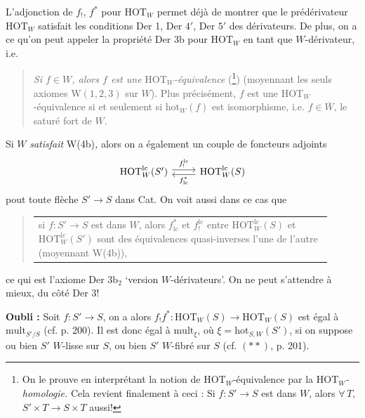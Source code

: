 L'adjonction de $f_!$, $f^*$ pour $\mathrm{HOT}_W$ permet déjà de montrer que le prédérivateur $\mathrm{HOT}_W$
satisfait les conditions Der 1, Der $4'$, Der $5'$ des dérivateurs. De plus, on a ce qu'on peut appeler la propriété Der 3b pour $\mathrm{HOT}_W$ en tant que $W$-dérivateur, i.e.

\begin{quote}
\textit{Si $f\in W$, alors $f$ est une} $\mathrm{HOT}_W$\textit{-équivalence} (\footnote{On le prouve en interprétant la notion de $\mathrm{HOT}_W$-équivalence par la $\mathrm{HOT}_W$\textit{-homologie.} Cela revient finalement à ceci : Si $f : S' \longrightarrow S$ est dans $W$, alors $\forall\, T$, $S'\times T \longrightarrow S\times T$ aussi!}) (moyennant les seuls axiomes W$(1,2,3)$ sur $W$). Plus précisément, $f$ est une $\mathrm{HOT}_W$-équivalence si et seulement si $\mathrm{hot}_W(f)$ est isomorphisme, i.e. $f\in \overline{W}$, le saturé fort de $W$.
\end{quote}

Si $W$ \textit{satisfait} W(4b)\textit{,} alors on a également un couple de foncteurs adjoints
\[
\begin{tikzcd}
\mathrm{HOT}_W^{\mathrm{lc}}(S') \arrow[r, shift left, "f_!^{\mathrm{lc}}"] & \mathrm{HOT}_W^{\mathrm{lc}}(S) \arrow[l, shift left, "f^*_{\mathrm{lc}}"]
\end{tikzcd}
\]
pout toute flèche $S'\longrightarrow S$ dans Cat. On voit aussi dans ce cas que %

\begin{quote}
\begin{tabular}{|p{0.9\linewidth}}
si $f : S' \longrightarrow S$ est dans $W$, alors $f^*_{\mathrm{lc}}$ et $f_!^{\mathrm{lc}}$ entre $\mathrm{HOT}_W^{\mathrm{lc}}(S)$ et $\mathrm{HOT}_W^{\mathrm{lc}}(S')$ sont des équivalences quasi-inverses l'une de l'autre (moyennant W(4b)),
\end{tabular}
\end{quote}

ce qui est l'axiome Der 3b$_2$ ‘version $W$-dérivateurs’. On ne peut s'attendre à mieux, du côté Der 3!

\textbf{Oubli :} Soit $f : S' \longrightarrow S$, on a alors $\boxed{f_!f^*} : \mathrm{HOT}_W(S) \longrightarrow \mathrm{HOT}_W(S)$ est égal à $\mathrm{mult}_{S'/S}$ (cf. p. 200). Il est donc égal à $\mathrm{mult}_\xi$, où $\xi = \mathrm{hot}_{S,W}(S')$, si on suppose ou bien $S'$ $W$-lisse sur $S$, ou bien $S'$ $W$-fibré sur $S$ (cf. $(**)$, p. 201).

